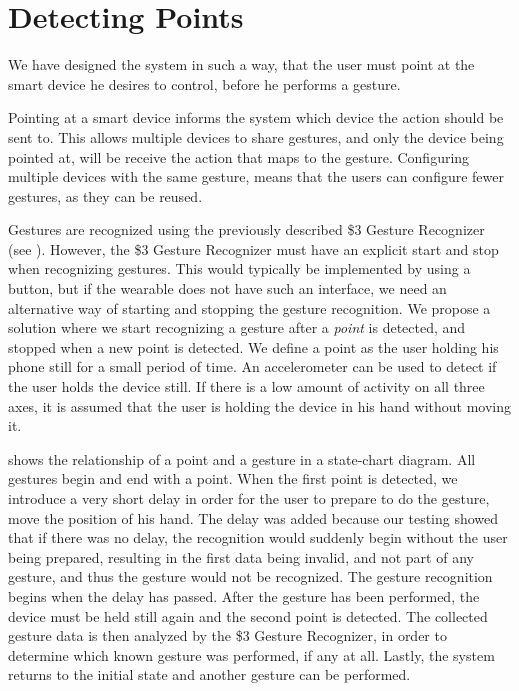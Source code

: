 \section{Detecting Points}\label{sec:detecting-points}

We have designed the system in such a way, 
that the user must point at the smart device he desires to control, 
before he performs a gesture.

Pointing at a smart device informs the system which device the action should be sent to. 
This allows multiple devices to share gestures, 
and only the device being pointed at, 
will be receive the action that maps to the gesture. 
Configuring multiple devices with the same gesture, 
means that the users can configure fewer gestures, 
as they can be reused.

Gestures are recognized using the previously described \$3 Gesture Recognizer (see ). 
However, the \$3 Gesture Recognizer must have an explicit start and stop when recognizing gestures. 
This would typically be implemented by using a button, 
but if the wearable does not have such an interface,
we need an alternative way of starting and stopping the gesture recognition.
We propose a solution where we start recognizing a gesture after a \emph{point} is detected,
and stopped when a new point is detected. 
We define a point as the user holding his phone still for a small period of time. 
An accelerometer can be used to detect if the user holds the device still. 
If there is a low amount of activity on all three axes, 
it is assumed that the user is holding the device in his hand without moving it.

 shows the relationship of a point and a gesture in a state-chart diagram. 
All gestures begin and end with a point. 
When the first point is detected, 
we introduce a very short delay in order for the user to prepare to do the gesture, 
\eg move the position of his hand. 
The delay was added because our testing showed that if there was no delay, 
the recognition would suddenly begin without the user being prepared, 
resulting in the first data being invalid, 
and not part of any gesture, 
and thus the gesture would not be recognized.
The gesture recognition begins when the delay has passed. 
After the gesture has been performed, 
the device must be held still again and the second point is detected. 
The collected gesture data is then analyzed by the \$3 Gesture Recognizer, 
in order to determine which known gesture was performed, if any at all. 
Lastly, the system returns to the initial state and another gesture can be performed.

